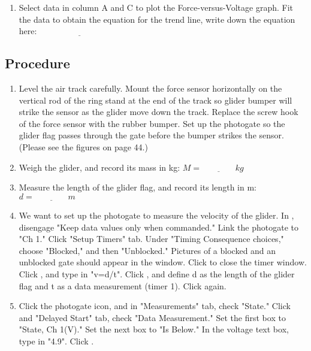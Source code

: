 \documentclass{article}
\begin{document}
\begin{enumerate}
\item %
Select data in column A and C to plot the Force-versus-Voltage graph. Fit the data to obtain the equation for the trend line, write down the equation here: $\underline{~~~~~~~~~~~~~~~~~~~~~~~~~~~~~~~~~~~~~~~~~~~}$

\end{enumerate}


\subsection*{Procedure}

\begin{enumerate}
\item Level the air track carefully. Mount the force sensor horizontally on the vertical rod of the ring stand at the end of the track so glider bumper will strike the sensor as the glider move down the track. Replace the screw hook of the force sensor with the rubber bumper. Set up the photogate so the glider flag passes through the gate before the bumper strikes the sensor. (Please see the figures on page 44.)

\item Weigh the glider, and record its mass in kg: $M=\underline{~~~~~~~~~~~~~~~~~~}kg$

\item Measure the length of the glider flag, and record its length in m: $d=\underline{~~~~~~~~~~~~~~~~~~}m$

\item We want to set up the photogate to measure the velocity of the glider. In , disengage "Keep data values only when commanded." Link the photogate to "Ch 1." Click "Setup Timers" tab. Under "Timing Consequence choices," choose "Blocked," and then "Unblocked." Pictures of a blocked and an unblocked gate should appear in the window. Click  to close the timer window. Click , and type in "v=d/t". Click , and define d as the length of the glider flag and t as a data measurement (timer 1). Click  again.

\item Click the photogate icon, and in "Measurements" tab, check "State." Click  and "Delayed Start" tab, check "Data Measurement." Set the first box to "State, Ch 1(V)." Set the next box to "Is Below." In the voltage text box, type in "4.9". Click .


\end{enumerate}
\end{document}
